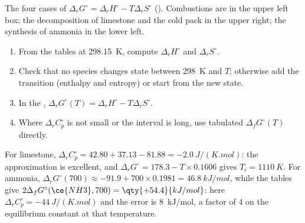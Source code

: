 \begin{omfigure}

{\small The four cases of $\Delta_r G^\circ = \Delta_r H^\circ - T\Delta_r
S^\circ$ (). Combustions are in the upper left box;
the decomposition of limestone and the cold pack in the upper right; the
synthesis of ammonia in the lower left.}
\end{omfigure}

\begin{method}\label{met:b2:reaction-free-energy:delta-g-standard}
\begin{enumerate}
  \item From the tables at \qty{298.15}{K}, compute $\Delta_r H^\circ$ and
        $\Delta_r S^\circ$.
  \item Check that no species changes state between \qty{298}{K} and $T$;
        otherwise add the transition (enthalpy and entropy) or start from
        the new state.
  \item In the , $\Delta_r G^\circ(T) = \Delta_r H^\circ
        - T\Delta_r S^\circ$.
  \item Where $\Delta_r C^\circ_p$ is not small or the interval is long,
        use tabulated $\Delta_f G^\circ(T)$ directly.
\end{enumerate}
\end{method}

\begin{example}\label{ex:b2:reaction-free-energy:tests}
For limestone, $\Delta_r C^\circ_p = 42.80 + 37.13 - 81.88 =
\qty{-2.0}{J/(K.mol)}$: the approximation is excellent, and $\Delta_r
G^\circ = 178.3 - T \times 0.1606$ gives $T_i = \qty{1110}{K}$. For ammonia,
$\Delta_r G^\circ(700) \approx -91.9 + 700 \times 0.1981 =
\qty{+46.8}{kJ/mol}$, while the tables give $2\Delta_f G^\circ(\ce{NH3}, 700) =
\qty{+54.4}{kJ/mol}$: here $\Delta_r C^\circ_p = \qty{-44}{J/(K.mol)}$ and
the error is \qty{8}{kJ/mol}, a factor of 4 on the equilibrium constant at
that temperature.
\end{example}

